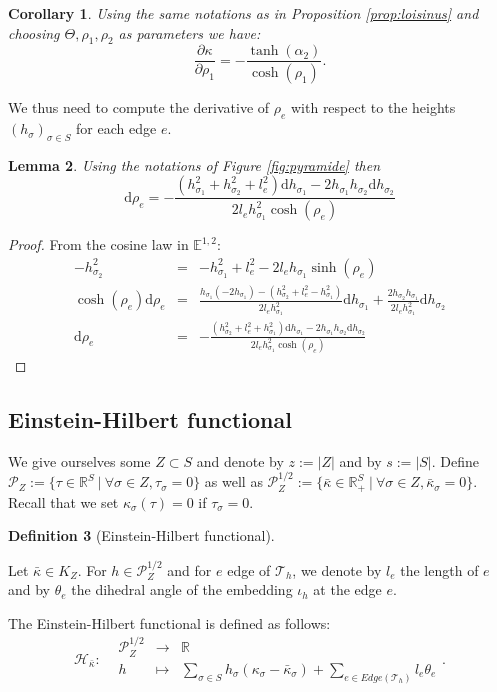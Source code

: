 \documentclass[a4paper,12pt]{article}
\def\TT{\mathcal T}
\def\adm{\P}
\def\d{\mathrm{d}}
\def\RR{\mathbb{R}}
\newcommand{\mass}[1]{{\mathbb E}^{1,2}_{#1}}
\def\d{\mathrm{d}}
\def\adm{\mathcal{P}}
\def\P{\mathcal{P}}
\newcommand{\function}[5]{\displaystyle#1:\begin{array}{l|rcl}
& \displaystyle #2 & \longrightarrow & \displaystyle #3 \\
	& \displaystyle #4 & \longmapsto & \displaystyle #5 \end{array}}
\newtheorem{lem}{Lemma}[section]		 %
\newtheorem{cor}[lem]{Corollary}
\theoremstyle{definition}
\newtheorem{defi}[lem]{Definition}	%
\begin{document}
					\begin{cor} \label{cor:drapeau}
						Using the same notations as in Proposition \ref{prop:loisinus} and choosing 
						 $\Theta,\rho_1,\rho_2$ as parameters we have:
							$$\frac{\partial \kappa}{\partial \rho_1} = -\frac{\tanh(\alpha_2)}{\cosh(\rho_1)}.$$
					\end{cor}
					


					
					We thus need to compute the derivative of $\rho_e$ with respect to the heights $(h_\sigma)_{\sigma\in S}$ for each edge $e$.
					\begin{lem}\label{lem:using_notations_figure_fig}
					Using the notations of Figure \ref{fig:pyramide} then
					$$\d \rho_{e} = - \frac{(h_{\sigma_1}^2+h_{\sigma_2}^2+l_e^2)\d h_{\sigma_1} - 2 h_{\sigma_1} h_{\sigma_2} \d h_{\sigma_2} }{2 l_e h_{\sigma_1}^2\cosh(\rho_{e})}$$

					\end{lem}
					\begin{proof}
					From the cosine law in $\mass{}$:
					\begin{eqnarray*} -h_{\sigma_2}^2 &=&-h_{\sigma_1}^2+l_e^2 - 2 l_e h_{\sigma_1} \sinh(\rho_e) \\
					\cosh(\rho_e)\d \rho_e &=& \frac{h_{\sigma_1}(-2h_{\sigma_1})-(h_{\sigma_2}^2+l_e^2-h_{\sigma_1}^2)}{2l_eh_{\sigma_1}^2} \d h_{\sigma_1} + \frac{2 h_{\sigma_2} h_{\sigma_1}}{2 l_e h_{\sigma_1}^2} \d h_{\sigma_2} \\
					\d \rho_e&=&- \frac{(h_{\sigma_2}^2+l_e^2 + h_{\sigma_1}^2)\d h_{\sigma_1} - 2 h_{\sigma_1} h_{\sigma_2} \d h_{\sigma_2} }{2 l_e h_{\sigma_1}^2\cosh(\rho_e)}
					\end{eqnarray*}
					\end{proof}

				\subsection{Einstein-Hilbert functional}
				
			
				 We give ourselves some $Z\subset S$ and denote by $z:=|Z|$ and by $s:=|S|$. Define $\adm_Z:= \{\tau \in \RR^S ~|~\forall \sigma\in Z,\tau_\sigma=0\}$ as well as $\adm_Z^{1/2}:= \{\bar\kappa \in \RR_+^S~|~ \forall \sigma\in Z,\bar\kappa_\sigma = 0\}$. Recall that we set $\kappa_\sigma(\tau)=0$ if $\tau_\sigma=0$.
				\begin{defi}[Einstein-Hilbert functional]\label{def:einstein_hilbert_functional}

						Let $\bar\kappa \in K_Z $.
						For $h\in \adm^{1/2}_Z$ and for $e$ edge of $\TT_h$, we denote by
						$l_e$ the length of $e$ and by $\theta_e$ the dihedral angle of the embedding $\iota_h$ at the edge $e$.

	 					The Einstein-Hilbert functional is defined as follows:
						 $$\function{\mathcal{H}_{\bar\kappa}}{\adm_Z^{1/2}}{\RR}{h}{\sum_{\sigma \in S} h_\sigma (\kappa_\sigma - \bar \kappa_\sigma)+ \sum_{e \in Edge(\TT_h)} l_e\theta_e}.$$
				\end{defi}
                    
\end{document}
